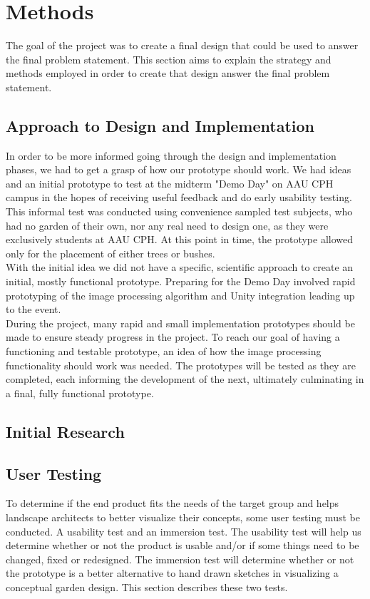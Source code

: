\chapter{Methods}
The goal of the project was to create a final design that could be used to answer the final problem statement. This section aims to explain the strategy and methods employed in order to create that design answer the final problem statement.

 
\section{Approach to Design and Implementation}

In order to be more informed going through the design and implementation phases, we had to get a grasp of how our prototype should work. We had ideas and an initial prototype to test at the midterm "Demo Day" on AAU CPH campus in the hopes of receiving useful feedback and do early usability testing. This informal test was conducted using convenience sampled test subjects, who had no garden of their own, nor any real need to design one, as they were exclusively students at AAU CPH. At this point in time, the prototype allowed only for the placement of either trees or bushes.\\

With the initial idea we did not have a specific, scientific approach to create an initial, mostly functional prototype. Preparing for the Demo Day involved rapid prototyping of the image processing algorithm and Unity integration leading up to the event.\\

During the project, many rapid and small implementation prototypes should be made to ensure steady progress in the project.
To reach our goal of having a functioning and testable prototype, an idea of how the image processing functionality should work was needed. The prototypes will be tested as they are completed, each informing the development of the next, ultimately culminating in a final, fully functional prototype.\\
\section{Initial Research}


\section{User Testing}
To determine if the end product fits the needs of the target group and helps landscape architects to better visualize their concepts, some user testing must be conducted. A usability test and an immersion test. The usability test will help us determine whether or not the product is usable and/or if some things need to be changed, fixed or redesigned. The immersion test will determine whether or not the prototype is a better alternative to hand drawn sketches in visualizing a conceptual garden design. This section describes these two tests.

